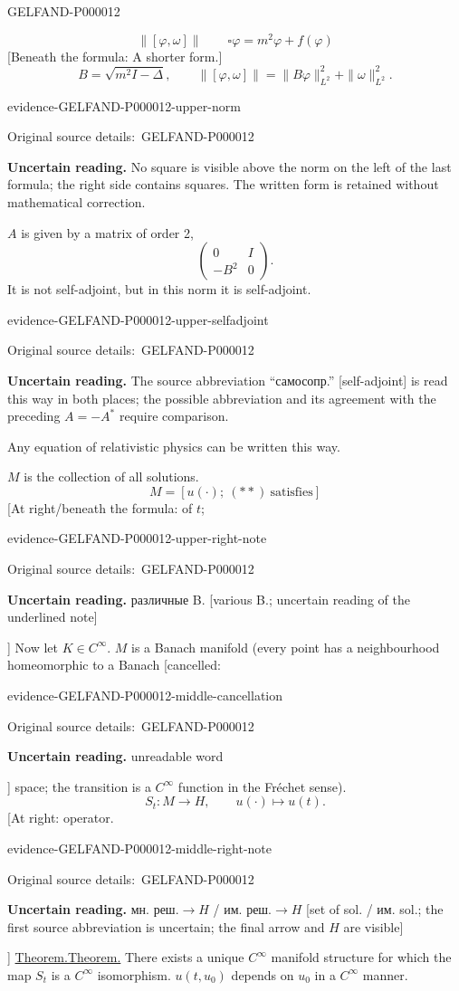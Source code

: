 \documentclass[11pt]{article}
\let\MathUnderline\underline
\renewcommand{\underline}[1]{\ifmmode\MathUnderline{#1}\else\uline{#1}\fi}
\newcommand{\SourcePage}[2]{\par\smallskip\phantomsection\label{#1:source-page}{\small\sffamily\color{blue!55!black}#1}\par\smallskip}
\newcommand{\EvidenceBlock}[4]{%
 \par\smallskip\noindent\begin{minipage}{\linewidth}
 \begin{minipage}[t]{.47\linewidth}\vspace{0pt}\centering
 \csname evidence-#1-#2\endcsname\par
 {\scriptsize\SourceCropCaption\ #1}\par
 \end{minipage}\hfill
 \begin{minipage}[t]{.49\linewidth}\vspace{0pt}\raggedright
 {\small\color{orange!65!black}\textbf{#4} #3}\par
 \end{minipage}
 \end{minipage}\par\smallskip}
\newcommand{\Unclear}[3]{\EvidenceBlock{#1}{#2}{#3}{\ReadingCaption}}
\newcommand{\SourceCropCaption}{Original source details:}\newcommand{\ReadingCaption}{Uncertain reading.}\newcommand{\IncompleteCaption}{Undeciphered passage.}\newcommand{\DiagramCaption}{Diagram and typed description.}
\begin{document}
\SourcePage{GELFAND-P000012}{unlabelled}
\begin{equation*}
\|[\varphi,\omega]\|\qquad
\square\varphi=m^2\varphi+f(\varphi)
\end{equation*}
[Beneath the formula: A shorter form.]
\begin{equation*}
B=\sqrt{m^2I-\Delta},\qquad
\|[\varphi,\omega]\|=\|B\varphi\|_{L^2}^{2}+\|\omega\|_{L^2}^{2}.
\end{equation*}
\Unclear{GELFAND-P000012}{upper-norm}{No square is visible above the norm on the left of the last formula; the right side contains squares. The written form is retained without mathematical correction.}
$A$ is given by a matrix of order 2,
\begin{equation*}
\begin{pmatrix}0&I\\-B^2&0\end{pmatrix}.
\end{equation*}
It is not self-adjoint, but in this norm it is self-adjoint.
\Unclear{GELFAND-P000012}{upper-selfadjoint}{The source abbreviation “самосопр.” [self-adjoint] is read this way in both places; the possible abbreviation and its agreement with the preceding $A=-A^*$ require comparison.}
Any equation of relativistic physics can be written this way.

$M$ is the collection of all solutions.
\begin{equation*}
M=[u(\cdot);\ (**)\ \text{satisfies}]
\end{equation*}
[At right/beneath the formula: of $t$; \Unclear{GELFAND-P000012}{upper-right-note}{различные B. [various B.; uncertain reading of the underlined note]}]
Now let $K\in C^\infty$.
$M$ is a Banach manifold (every point has a neighbourhood homeomorphic to a Banach [cancelled: \Unclear{GELFAND-P000012}{middle-cancellation}{unreadable word}] space; the transition is a $C^\infty$ function in the Fréchet sense).
\begin{equation*}
S_t:M\longrightarrow H,\qquad u(\cdot)\longmapsto u(t).
\end{equation*}
[At right: operator. \Unclear{GELFAND-P000012}{middle-right-note}{$\text{мн. реш.}\longrightarrow H$ / $\text{им. реш.}\longrightarrow H$ [set of sol. / им. sol.; the first source abbreviation is uncertain; the final arrow and $H$ are visible]}]
\underline{Theorem.} There exists a unique $C^\infty$ manifold structure for which the map $S_t$ is a $C^\infty$ isomorphism.
$u(t,u_0)$ depends on $u_0$ in a $C^\infty$ manner.
\end{document}
